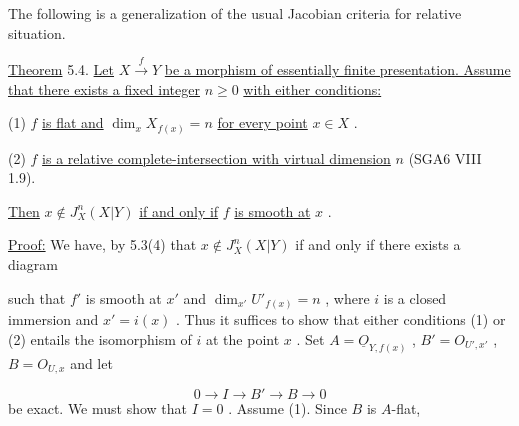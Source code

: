 The following is a generalization of the usual Jacobian criteria for relative situation.

\underline{Theorem} 5.4.   \underline{Let} $X \overset{f}{\to} Y$ \underline{be a morphism of essentially finite presentation. Assume that there exists a fixed integer} $n \geq 0$ \underline{with either conditions:}

(1)  $f$  \underline{is flat and} $\dim_{x}X_{f(x)} = n$ \underline{for every point} $x \in X$ .

(2)  $f$  \underline{is a relative complete-intersection with virtual dimension} $n$ (SGA6 VIII 1.9).

\underline{Then} $x \notin J^{n}_{X}(X|Y)$ \underline{if and only if} $f$ \underline{is smooth at} $x$ .

\underline{Proof:}  We have, by 5.3(4) that $x \notin J^{n}_{X}(X|Y)$ if and only if there exists a diagram
such that $f'$ is smooth at $x'$ and $\dim_{x'}U'_{f(x)} = n$ , where $i$ is a closed immersion and $x' = i(x)$ . Thus it suffices to show that either conditions (1) or (2) entails the isomorphism of $i$ at the point $x$ . Set $A = \underline{O}_{Y,f(x)}$ , $B' = O_{U',x'}$ , $B = O_{U,x}$ and let

\begin{equation*}
0 \to I \to B' \to B \to 0
\end{equation*}
be exact. We must show that $I = 0$ . Assume (1). Since $B$ is $A$-flat,

